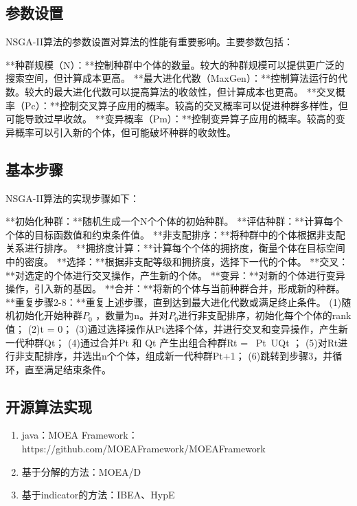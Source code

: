 \documentclass[lang=cn,a4paper,citestyle=gb7714-2015, bibstyle=gb7714-2015]{elegantpaper}
\begin{document}
    \subsection{参数设置}
    NSGA-II算法的参数设置对算法的性能有重要影响。主要参数包括：

    **种群规模（N）：**控制种群中个体的数量。较大的种群规模可以提供更广泛的搜索空间，但计算成本更高。
    **最大进化代数（MaxGen）：**控制算法运行的代数。较大的最大进化代数可以提高算法的收敛性，但计算成本也更高。
    **交叉概率（Pc）：**控制交叉算子应用的概率。较高的交叉概率可以促进种群多样性，但可能导致过早收敛。
    **变异概率（Pm）：**控制变异算子应用的概率。较高的变异概率可以引入新的个体，但可能破坏种群的收敛性。

    \subsection{基本步骤}

    NSGA-II算法的实现步骤如下：

    **初始化种群：**随机生成一个N个个体的初始种群。
    **评估种群：**计算每个个体的目标函数值和约束条件值。
    **非支配排序：**将种群中的个体根据非支配关系进行排序。
    **拥挤度计算：**计算每个个体的拥挤度，衡量个体在目标空间中的密度。
    **选择：**根据非支配等级和拥挤度，选择下一代的个体。
    **交叉：**对选定的个体进行交叉操作，产生新的个体。
    **变异：**对新的个体进行变异操作，引入新的基因。
    **合并：**将新的个体与当前种群合并，形成新的种群。
    **重复步骤2-8：**重复上述步骤，直到达到最大进化代数或满足终止条件。
    (1)随机初始化开始种群$P_0$ ，数量为n。并对$P_0$进行非支配排序，初始化每个个体的rank值；
    (2)t = 0；
    (3)通过选择操作从Pt选择个体，并进行交叉和变异操作，产生新一代种群Qt；
    (4)通过合并Pt 和 Qt 产生出组合种群Rt =  Pt UQt ；
    (5)对Rt进行非支配排序，并选出n个个体，组成新一代种群Pt+1；
    (6)跳转到步骤3，并循环，直至满足结束条件。

    \subsection{开源算法实现}

    \begin{enumerate}
        \item java：MOEA Framework：https://github.com/MOEAFramework/MOEAFramework
        \item 基于分解的方法：MOEA/D
        \item 基于indicator的方法：IBEA、HypE
    \end{enumerate}
\end{document}
